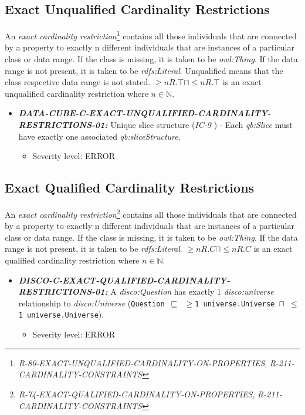 \documentclass{llncs}
\newcommand{\ms}[1]{\texttt{#1}}
\begin{document}
\subsection{Exact Unqualified Cardinality Restrictions}

An \emph{exact cardinality restriction}\footnote{{\em R-80-EXACT-UNQUALIFIED-CARDINALITY-ON-PROPERTIES}, {\em R-211-CARDINALITY-CONSTRAINTS}} contains all those individuals that are connected by a property to exactly n different individuals that are instances of a particular class or data range. 
If the class is missing, it is taken to be \emph{owl:Thing}. 
If the data range is not present, it is taken to be \emph{rdfs:Literal}.
Unqualified means that the class respective data range is not stated. 
$\geq n R. \top \sqcap \leq n R. \top $ is an exact unqualified cardinality restriction where $n \in \mathbb{N}$.

\begin{itemize}
	\item \textbf{{\em DATA-CUBE-C-EXACT-UNQUALIFIED-CARDINALITY-RESTRICTIONS-01:}}
	Unique slice structure (\emph{IC-9} \cite{CyganiakReynolds2014}) -  
	Each \emph{qb:Slice} must have exactly one associated \emph{qb:sliceStructure}. 
	\begin{itemize}
		\item Severity level: ERROR
	\end{itemize}
\end{itemize}

\subsection{Exact Qualified Cardinality Restrictions}

An \emph{exact cardinality restriction}\footnote{{\em R-74-EXACT-QUALIFIED-CARDINALITY-ON-PROPERTIES}, {\em R-211-CARDINALITY-CONSTRAINTS}} contains all those individuals that are connected by a property to exactly n different individuals that are instances of a particular class or data range. 
If the class is missing, it is taken to be \emph{owl:Thing}. 
If the data range is not present, it is taken to be \emph{rdfs:Literal}.
$\geq n R. C \sqcap \leq n R. C $ is an exact qualified cardinality restriction where $n \in \mathbb{N}$.

\begin{itemize}
	\item \textbf{{\em DISCO-C-EXACT-QUALIFIED-CARDINALITY-RESTRICTIONS-01:}}
A {\em disco:Question} has exactly 1 {\em disco:universe} relationship to {\em disco:Universe} (\ms{Question $\sqsubseteq$ $\geq$1 universe.Universe $\sqcap$ $\leq$1 universe.Universe}).
  \begin{itemize}
		\item Severity level: ERROR
	\end{itemize}
\end{itemize}
\end{document}
